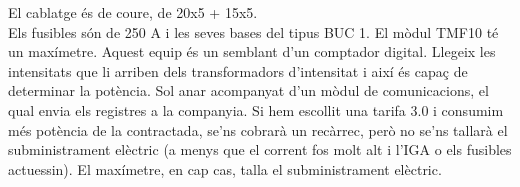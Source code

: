 \newline El cablatge és de coure, de 20x5 + 15x5.\\
\newline Els fusibles són de 250 A i les seves bases del tipus BUC 1.
\newline El mòdul TMF10 té un maxímetre. Aquest equip és un semblant d'un comptador digital. Llegeix les intensitats que li arriben dels transformadors d'intensitat i així és capaç de determinar la potència. Sol anar acompanyat d'un mòdul de comunicacions, el qual envia els registres a la companyia. Si hem escollit una tarifa 3.0 i consumim més potència de la contractada, se'ns cobrarà un recàrrec, però no se'ns tallarà el subministrament elèctric (a menys que el corrent fos molt alt i l'IGA o els fusibles actuessin). El maxímetre, en cap cas, talla el subministrament elèctric.


\clearpage